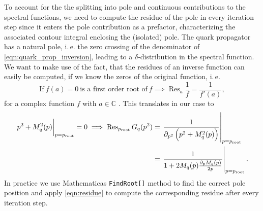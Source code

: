To account for the the splitting  into pole and continuous contributions to the spectral functions, we need to compute the residue of the pole in every iteration step since it enters the pole contribution as a prefactor, characterizing the associated contour integral enclosing the (isolated) pole. The quark propagator has a natural pole, i.\,e. the zero crossing of the denominator of \eqref{eqn:quark_prop_inversion}, leading to a $\delta$-distribution in the spectral function. \\
We want to make use of the fact, that the residues of an inverse function can easily be computed, if we know the zeros of the original function, i.\,e.
\begin{equation}
	\text{If}\ f(a) = 0\ \text{is a first order root of}\ f \implies \operatorname{Res}_a \frac{1}{f} = \frac{1}{f'(a)},
\end{equation} 
for a complex function $f$ with $a\in\mathbb{C}$ \cite{Marshall2019}.
This translates in our case to
\begin{equation}
\begin{aligned}
	 \eval{p^2 + M_q^2(p)}_{p=p_{\mathrm{root}}} = 0 \implies \operatorname{Res}_{p_{\mathrm{root}}} G_q(p^2) &= \eval{\frac{1}{\partial_{p^2}\left(p^2 + M_q^2(p)\right)}}_{p=p_{\mathrm{root}}} \\ 
	 &=  \eval{\frac{1}{1 + 2M_q(p)\frac{\partial_pM_q(p)}{2p}}}_{p=p_{\mathrm{root}}}.
	 \end{aligned}\label{eqn:residue}
\end{equation}
In practice we use Mathematicas \texttt{FindRoot[]} method to find the correct pole position and apply \eqref{eqn:residue} to compute the corresponding residue after every iteration step.